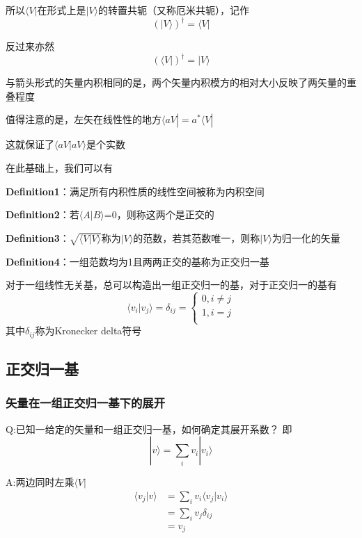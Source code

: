 \documentclass[lang=cn,15pt]{elegantbook}
\begin{document}
所以$\langle V|$在形式上是$|V\rangle$的转置共轭（又称厄米共轭），记作
\begin{equation}
	\left( |V\rangle \right) ^{\dagger}=\langle V|
\end{equation}

反过来亦然
\begin{equation}
	\left( \langle V| \right) ^{\dagger}=|V\rangle 
\end{equation}

与箭头形式的矢量内积相同的是，两个矢量内积模方的相对大小反映了两矢量的重叠程度

值得注意的是，左矢在线性性的地方$\langle aV|=a^*\langle  V|$

这就保证了$\langle aV|aV\rangle $是个实数

在此基础上，我们可以有

\textbf{Definition1}：满足所有内积性质的线性空间被称为内积空间

\textbf{Definition2}：若$\langle A|B\rangle $=0，则称这两个是正交的

\textbf{Definition3}：$\sqrt{\langle V|V\rangle }$称为$|V\rangle$的范数，若其范数唯一，则称$|V\rangle$为归一化的矢量

\textbf{Definition4}：一组范数均为1且两两正交的基称为正交归一基

对于一组线性无关基，总可以构造出一组正交归一的基，对于正交归一的基有
\begin{equation}
	\langle v_i|v_j\rangle =\delta _{ij}=\begin{cases}
		0,i\ne j\\
		1,i=j\\
	\end{cases}
\end{equation}
其中$\delta _{ij}$称为Kronecker delta符号

\subsection{正交归一基}
\subsubsection{矢量在一组正交归一基下的展开}
Q:已知一给定的矢量和一组正交归一基，如何确定其展开系数？
即\begin{equation*}
	|v\rangle=\sum_{i}v_i|v_i\rangle
\end{equation*}

A:两边同时左乘$\langle V|$
\begin{equation*}
	\begin{split}
		\langle v_j|v\rangle&=\sum_{i}v_i\langle v_j|v_i\rangle\\
		&=\sum_{i}v_j\delta_{ij}\\
		&=v_j
	\end{split}
\end{equation*}
\end{document}

